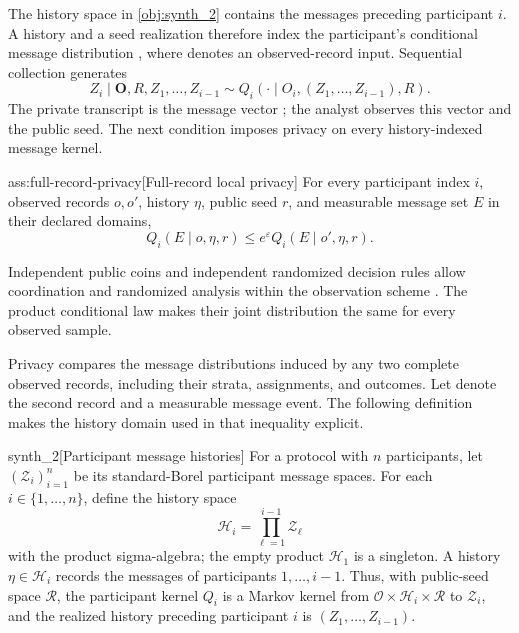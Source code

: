 The history space  in \cref{obj:synth_2} contains the messages preceding participant \(i\). A history  and a seed realization  therefore index the participant's conditional message distribution , where  denotes an observed-record input. Sequential collection generates
\[
Z_i\mid \mathbf O,R,Z_1,\ldots,Z_{i-1}
\sim Q_i(\cdot\mid O_i,(Z_1,\ldots,Z_{i-1}),R).
\]
The private transcript is the message vector ; the analyst observes this vector and the public seed. The next condition imposes privacy on every history-indexed message kernel.

\begin{assumptionv}{ass:full-record-privacy}[Full-record local privacy]
For every participant index \(i\), observed records \(o,o'\), history \(\eta\), public seed \(r\), and measurable message set \(E\) in their declared domains,
\[
Q_i(E\mid o,\eta,r)\le e^\varepsilon Q_i(E\mid o',\eta,r).
\]
\end{assumptionv}

Independent public coins and independent randomized decision rules allow coordination and randomized analysis within the observation scheme \citep{AcharyaCanonneFreitagTyagi2019TestWithoutTrust}. The product conditional law makes their joint distribution the same for every observed sample.

Privacy compares the message distributions induced by any two complete observed records, including their strata, assignments, and outcomes. Let  denote the second record and  a measurable message event. The following definition makes the history domain used in that inequality explicit.

\begin{definitionv}{synth_2}[Participant message histories]
For a protocol with \(n\) participants, let \((\mathcal Z_i)_{i=1}^n\) be its standard-Borel participant message spaces. For each \(i\in\{1,\ldots,n\}\), define the history space
\[
\mathcal H_i=\prod_{\ell=1}^{i-1}\mathcal Z_\ell
\]
with the product sigma-algebra; the empty product \(\mathcal H_1\) is a singleton. A history \(\eta\in\mathcal H_i\) records the messages of participants \(1,\ldots,i-1\). Thus, with public-seed space \(\mathcal R\), the participant kernel \(Q_i\) is a Markov kernel from \(\mathcal O\times\mathcal H_i\times\mathcal R\) to \(\mathcal Z_i\), and the realized history preceding participant \(i\) is \((Z_1,\ldots,Z_{i-1})\).
\end{definitionv}

